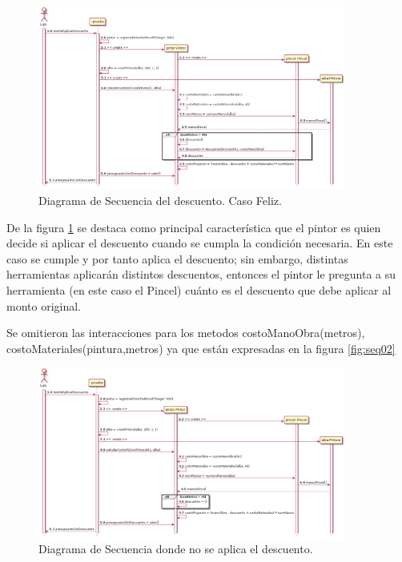 \documentclass[titlepage,a4paper]{article}
\begin{document}
\begin{figure}[H]
  \centering
  \includegraphics[width=0.9\textwidth]{diagrama_secuencia03.png}
  \caption{\label{fig:seq03}Diagrama de Secuencia del descuento. Caso Feliz.}
  \end{figure}

  De la figura \ref{fig:seq03} se destaca como principal característica que el pintor es quien decide si aplicar el descuento cuando se cumpla la condición necesaria. 
  En este caso se cumple y por tanto aplica el descuento; sin embargo, distintas herramientas aplicarán distintos 
  descuentos, entonces el pintor le pregunta a su herramienta (en este caso el Pincel) cuánto es el descuento que debe aplicar al monto original.

  Se omitieron las interacciones para los metodos costoManoObra(metros), costoMateriales(pintura,metros) ya que están 
  expresadas en la figura \ref{fig:seq02}

  \begin{figure}[H]
    \centering
    \includegraphics[width=0.9\textwidth]{diagrama_secuencia04.png}
    \caption{\label{fig:seq04}Diagrama de Secuencia donde no se aplica el descuento.}
    \end{figure}
\end{document}
